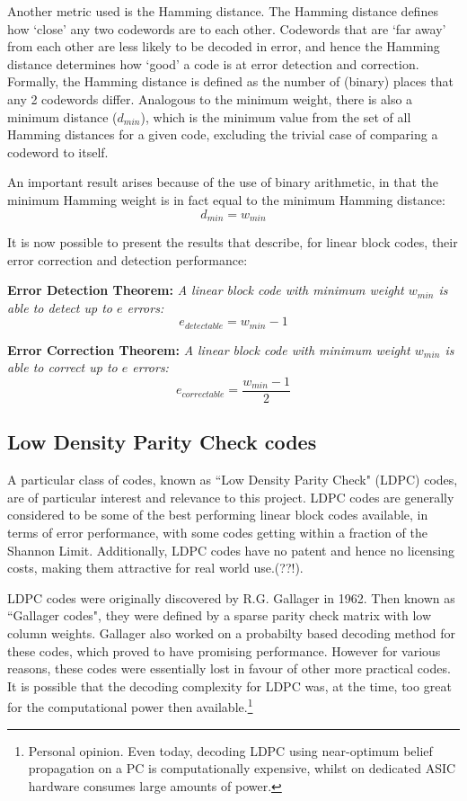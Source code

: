 \documentclass[11pt]{article}
\numberwithin{equation}{subsection}
\begin{document}
Another metric used is the Hamming distance. The Hamming distance defines how `close' any two codewords are to each other. Codewords that are `far away' from each other are less likely to be decoded in error, and hence the Hamming distance determines how `good' a code is at error detection and correction. Formally, the Hamming distance is defined as the number of (binary) places that any 2 codewords differ. Analogous to the minimum weight, there is also a minimum distance ($d_{min}$), which is the minimum value from the set of all Hamming distances for a given code, excluding the trivial case of comparing a codeword to itself.

An important result arises because of the use of binary arithmetic, in that the minimum Hamming weight is in fact equal to the minimum Hamming distance:
\begin{equation}
d_{min} = w_{min}
\end{equation}

It is now possible to present the results that describe, for linear block codes, their error correction and detection performance:

\medskip
\noindent
\textbf{Error Detection Theorem:}
\textit{A linear block code with minimum weight $w_{min}$ is able to detect up to $e$ errors:}
\begin{equation}
e_{detectable} = w_{min} - 1
\end{equation}

\noindent
\textbf{Error Correction Theorem:}
\textit{A linear block code with minimum weight $w_{min}$ is able to correct up to $e$ errors:}
\begin{equation}
e_{correctable} = \dfrac{w_{min} - 1}{2}
\end{equation}

\subsection{Low Density Parity Check codes}
A particular class of codes, known as ``Low Density Parity Check" (LDPC) codes, are of particular interest and relevance to this project. LDPC codes are generally considered to be some of the best performing linear block codes available, in terms of error performance, with some codes getting within a fraction of the Shannon Limit. Additionally, LDPC codes have no patent and hence no licensing costs, making them attractive for real world use.(??!).

LDPC codes were originally discovered by R.G. Gallager in 1962. Then known as ``Gallager codes", they were defined by a sparse parity check matrix with low column weights. Gallager also worked on a probabilty based decoding method for these codes, which proved to have promising performance. However for various reasons, these codes were essentially lost in favour of other more practical codes. It is possible that the decoding complexity for LDPC was, at the time, too great for the computational power then available.\footnote{Personal opinion. Even today, decoding LDPC using near-optimum belief propagation on a PC is computationally expensive, whilst on dedicated ASIC hardware consumes large amounts of power.}
\end{document}
